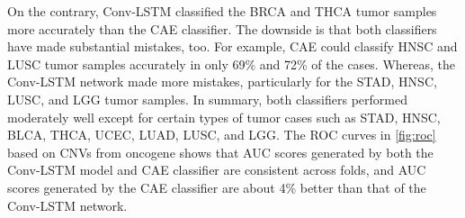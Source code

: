 \hspace*{3.5mm} On the contrary, Conv-LSTM classified the BRCA and THCA tumor samples more accurately than the CAE classifier. The downside is that both classifiers have made substantial mistakes, too. For example, CAE could classify HNSC and LUSC tumor samples accurately in only 69\% and 72\% of the cases. Whereas, the Conv-LSTM network made more mistakes, particularly for the STAD, HNSC, LUSC, and LGG tumor samples. In summary, both classifiers performed moderately well except for certain types of tumor cases such as STAD, HNSC, BLCA, THCA, UCEC, LUAD, LUSC, and LGG. The ROC curves in \cref{fig:roc} based on CNVs from oncogene shows that AUC scores generated by both the Conv-LSTM model and CAE classifier are consistent across folds, and AUC scores generated by the CAE classifier are about 4\% better than that of the Conv-LSTM network.

